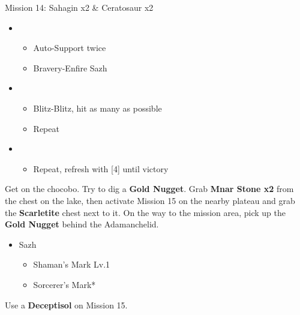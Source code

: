 \begin{battle}{Mission 14: Sahagin x2 \& Ceratosaur x2}
	\begin{itemize}
		\item \third
			\begin{itemize}
				\item Auto-Support twice
				\item Bravery-Enfire Sazh
			\end{itemize}
		\item \fourth
			\begin{itemize}
				\item Blitz-Blitz, hit as many as possible
				\item Repeat
			\end{itemize}
		\item \sixth
			\begin{itemize}
				\item Repeat, refresh with [4] until victory
			\end{itemize}
	\end{itemize}
\end{battle}

Get on the chocobo.
Try to dig a \textbf{Gold Nugget}.
Grab \textbf{Mnar Stone x2} from the chest on the lake, then activate Mission 15 on the nearby plateau and grab the \textbf{Scarletite} chest next to it.
On the way to the mission area, pick up the \textbf{Gold Nugget} behind the Adamanchelid.

\begin{menu}
	\begin{itemize}
		\equip
		\begin{itemize}
			\item Sazh
				\begin{itemize}
					\item Shaman's Mark Lv.1
					\item Sorcerer's Mark*
				\end{itemize}
		\end{itemize}
	\end{itemize}
\end{menu}

Use a \textbf{Deceptisol} on Mission 15.

